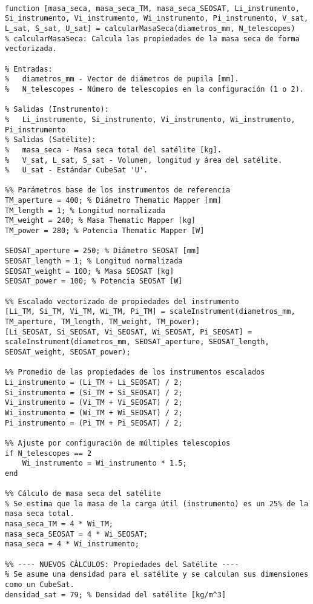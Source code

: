 \begin{verbatim}

function [masa_seca, masa_seca_TM, masa_seca_SEOSAT, Li_instrumento, Si_instrumento, Vi_instrumento, Wi_instrumento, Pi_instrumento, V_sat, L_sat, S_sat, U_sat] = calcularMasaSeca(diametros_mm, N_telescopes)
% calcularMasaSeca: Calcula las propiedades de la masa seca de forma vectorizada.

% Entradas:
%   diametros_mm - Vector de diámetros de pupila [mm].
%   N_telescopes - Número de telescopios en la configuración (1 o 2).

% Salidas (Instrumento):
%   Li_instrumento, Si_instrumento, Vi_instrumento, Wi_instrumento, Pi_instrumento
% Salidas (Satélite):
%   masa_seca - Masa seca total del satélite [kg].
%   V_sat, L_sat, S_sat - Volumen, longitud y área del satélite.
%   U_sat - Estándar CubeSat 'U'.

%% Parámetros base de los instrumentos de referencia
TM_aperture = 400; % Diámetro Thematic Mapper [mm]
TM_length = 1; % Longitud normalizada
TM_weight = 240; % Masa Thematic Mapper [kg]
TM_power = 280; % Potencia Thematic Mapper [W]

SEOSAT_aperture = 250; % Diámetro SEOSAT [mm]
SEOSAT_length = 1; % Longitud normalizada
SEOSAT_weight = 100; % Masa SEOSAT [kg]
SEOSAT_power = 100; % Potencia SEOSAT [W]

%% Escalado vectorizado de propiedades del instrumento
[Li_TM, Si_TM, Vi_TM, Wi_TM, Pi_TM] = scaleInstrument(diametros_mm, TM_aperture, TM_length, TM_weight, TM_power);
[Li_SEOSAT, Si_SEOSAT, Vi_SEOSAT, Wi_SEOSAT, Pi_SEOSAT] = scaleInstrument(diametros_mm, SEOSAT_aperture, SEOSAT_length, SEOSAT_weight, SEOSAT_power);

%% Promedio de las propiedades de los instrumentos escalados
Li_instrumento = (Li_TM + Li_SEOSAT) / 2;
Si_instrumento = (Si_TM + Si_SEOSAT) / 2;
Vi_instrumento = (Vi_TM + Vi_SEOSAT) / 2;
Wi_instrumento = (Wi_TM + Wi_SEOSAT) / 2;
Pi_instrumento = (Pi_TM + Pi_SEOSAT) / 2;

%% Ajuste por configuración de múltiples telescopios
if N_telescopes == 2
    Wi_instrumento = Wi_instrumento * 1.5;
end

%% Cálculo de masa seca del satélite
% Se estima que la masa de la carga útil (instrumento) es un 25% de la masa seca total.
masa_seca_TM = 4 * Wi_TM;
masa_seca_SEOSAT = 4 * Wi_SEOSAT;
masa_seca = 4 * Wi_instrumento;

%% ---- NUEVOS CÁLCULOS: Propiedades del Satélite ----
% Se asume una densidad para el satélite y se calculan sus dimensiones como un CubeSat.
densidad_sat = 79; % Densidad del satélite [kg/m^3]


\end{verbatim}
